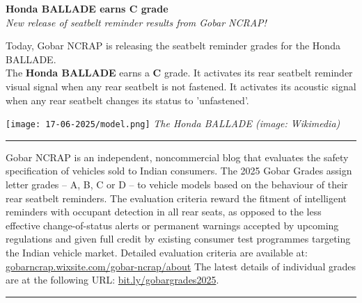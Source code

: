 \documentclass[a4paper,12pt]{article}
\begin{document}
    \begin{center}
        {\color{triton_green} \Large \textbf{Honda BALLADE earns C grade}}\\
        \vspace{0.5cm}
        {\large \textit{New release of seatbelt reminder results from Gobar NCRAP!}}
    \end{center}

    \begin{multicols}{2}

    Today, Gobar NCRAP is releasing the seatbelt reminder grades for the Honda BALLADE.\\

    The \textbf{Honda BALLADE} earns a \colorbox{C}{\textbf{C}} grade. It activates its rear seatbelt reminder visual signal when any rear seatbelt is not fastened. It activates its acoustic signal when any rear seatbelt changes its status to 'unfastened'. 

    \begin{center}
        \noindent {}
    \end{center}
                               
    \begin{center}
        \texttt{[image: 17-06-2025/model.png]}
        \textit{The Honda BALLADE (image: Wikimedia)}
    \end{center}

    \begin{footnotesize}
        \vspace{0.02in}\hrule\vspace{0.02in}\noindent Gobar NCRAP is an independent, noncommercial blog that evaluates the safety specification of vehicles sold to Indian consumers. The 2025 Gobar Grades assign letter grades -- A, B, C or D -- to vehicle models based on the behaviour of their rear seatbelt reminders. The evaluation criteria reward the fitment of intelligent reminders with occupant detection in all rear seats, as opposed to the less effective change-of-status alerts or permanent warnings accepted by upcoming regulations and given full credit by existing consumer test programmes targeting the Indian vehicle market. Detailed evaluation criteria are available at: \href{https://gobarncrap.wixsite.com/gobar-ncrap/about}{gobarncrap.wixsite.com/gobar-ncrap/about} The latest details of individual grades are at the following URL: \href{https://gobarncrap.wixsite.com/gobar-ncrap/2025-evaluations}{bit.ly/gobargrades2025}.
        \vspace{0.02in}\hrule
    \end{footnotesize}
    \end{multicols}
    
    
\end{document}
